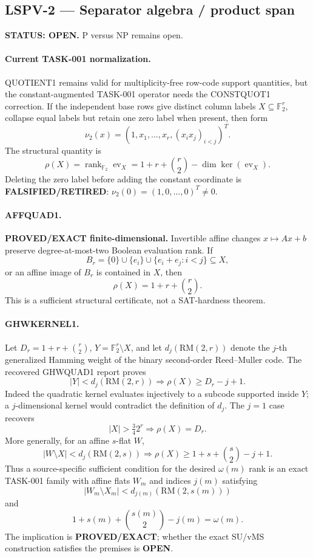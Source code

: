 \documentclass[11pt]{article}
\begin{document}
\subsection{LSPV-2 --- Separator algebra / product span}
\textbf{STATUS: OPEN.} P versus NP remains open.

\paragraph{Current TASK-001 normalization.}
QUOTIENT1 remains valid for multiplicity-free row-code support quantities, but the constant-augmented TASK-001 operator needs the CONSTQUOT1 correction.  If the independent base rows give distinct column labels \(X\subseteq\mathbb F_2^r\), collapse equal labels but retain one zero label when present, then form
\[
 \nu_2(x)=\left(1,x_1,\ldots,x_r,(x_ix_j)_{i<j}\right)^T.
\]
The structural quantity is
\[
 \rho(X)=\operatorname{rank}_{\mathbb F_2}\operatorname{ev}_X
 =1+r+\binom r2-\dim\ker(\operatorname{ev}_X).
\]
Deleting the zero label before adding the constant coordinate is \textbf{FALSIFIED/RETIRED}: \(\nu_2(0)=(1,0,\ldots,0)^T\neq0\).

\paragraph{AFFQUAD1.}
\textbf{PROVED/EXACT finite-dimensional.}  Invertible affine changes \(x\mapsto Ax+b\) preserve degree-at-most-two Boolean evaluation rank.  If
\[
 B_r=\{0\}\cup\{e_i\}\cup\{e_i+e_j:i<j\}\subseteq X,
\]
or an affine image of \(B_r\) is contained in \(X\), then
\[
 \rho(X)=1+r+\binom r2.
\]
This is a sufficient structural certificate, not a SAT-hardness theorem.

\paragraph{GHWKERNEL1.}
Let \(D_r=1+r+\binom r2\), \(Y=\mathbb F_2^r\setminus X\), and let \(d_j(\mathrm{RM}(2,r))\) denote the \(j\)-th generalized Hamming weight of the binary second-order Reed--Muller code.  The recovered GHWQUAD1 report proves
\[
 \boxed{
 |Y|<d_j(\mathrm{RM}(2,r))
 \Longrightarrow
 \rho(X)\ge D_r-j+1.
 }
\]
Indeed the quadratic kernel evaluates injectively to a subcode supported inside \(Y\); a \(j\)-dimensional kernel would contradict the definition of \(d_j\).  The \(j=1\) case recovers
\[
 |X|>\tfrac34 2^r\Longrightarrow \rho(X)=D_r.
\]
More generally, for an affine \(s\)-flat \(W\),
\[
 |W\setminus X|<d_j(\mathrm{RM}(2,s))
 \Longrightarrow
 \rho(X)\ge1+s+\binom s2-j+1.
\]
Thus a source-specific sufficient condition for the desired \(\omega(m)\) rank is an exact TASK-001 family with affine flats \(W_m\) and indices \(j(m)\) satisfying
\[
 |W_m\setminus X_m|<d_{j(m)}(\mathrm{RM}(2,s(m)))
\]
and
\[
 1+s(m)+\binom{s(m)}2-j(m)=\omega(m).
\]
The implication is \textbf{PROVED/EXACT}; whether the exact SU/vMS construction satisfies the premises is \textbf{OPEN}.
\end{document}
